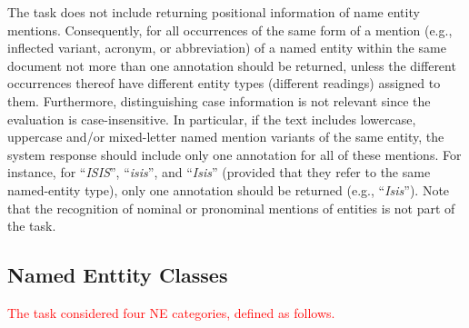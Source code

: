\documentclass[11pt]{article}
\newcommand{\alert}[1]{\textcolor{red}{#1}}
\begin{document}
\noindent The task does not include returning positional information of name
entity mentions. Consequently, for all occurrences of the same form of a
mention (e.g., inflected variant, acronym, or abbreviation) of a named entity
within the same document not more than one annotation should be returned,
unless the different occurrences thereof have different entity types (different
readings) assigned to them. Furthermore, distinguishing case information is not
relevant since the evaluation is case-insensitive. In particular, if the text
includes lowercase, uppercase and/or mixed-letter named mention variants of the
same entity, the system response should include only one annotation for all of
these mentions.  For instance, for ``\textit{ISIS}'', ``\textit{isis}'', and
``\textit{Isis}'' (provided that they refer to the same named-entity type),
only one annotation should be returned (e.g., ``\textit{Isis}''). Note that the
recognition of nominal or pronominal mentions of entities is not part of the
task. 

\subsection{Named Enttity Classes}

\alert{The task considered four NE categories, defined as follows.}
\end{document}
